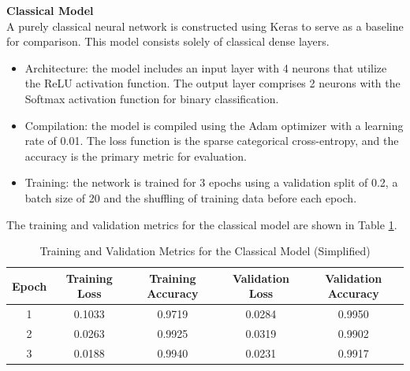 \documentclass[10pt]{article}
\begin{document}
\noindent \textbf{Classical Model} \\
A purely classical neural network is constructed using Keras to serve as a baseline for comparison. This model consists solely of classical dense layers.
\begin{itemize}
    \item Architecture: the model includes an input layer with 4 neurons that utilize the ReLU activation function. The output layer comprises 2 neurons with the Softmax activation function for binary classification.
    \item Compilation: the model is compiled using the Adam optimizer with a learning rate of 0.01. The loss function is the sparse categorical cross-entropy, and the accuracy is the primary metric for evaluation.
    \item Training: the network is trained for 3 epochs using a validation split of 0.2, a batch size of 20 and the shuffling of training data before each epoch.
\end{itemize}

The training and validation metrics for the classical model are shown in Table \ref{tab:classical_model_metrics}.

\begin{table}[H]
    \centering
    \caption{Training and Validation Metrics for the Classical Model (Simplified)}
    \label{tab:classical_model_metrics}
    \begin{tabular}{|c|c|c|c|c|}
        \hline
        \textbf{Epoch} & \textbf{Training Loss} & \textbf{Training Accuracy} & \textbf{Validation Loss} & \textbf{Validation Accuracy} \\
        \hline
        1 & 0.1033 & 0.9719 & 0.0284 & 0.9950 \\
        2 & 0.0263 & 0.9925 & 0.0319 & 0.9902 \\
        3 & 0.0188 & 0.9940 & 0.0231 & 0.9917 \\
        \hline
    \end{tabular}
\end{table}
\end{document}
